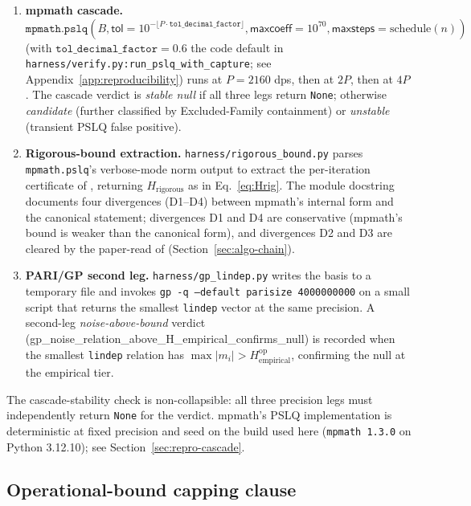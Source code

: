 \documentclass[11pt,a4paper]{article}
\newcommand{\Hrig}{H_{\mathrm{rigorous}}}
\newcommand{\Hempop}{H_{\mathrm{empirical}}^{\mathrm{op}}}
\begin{document}
\begin{enumerate}[itemsep=2pt,topsep=2pt]
\item \textbf{mpmath cascade.}
  $\texttt{mpmath.pslq}(B, \textsf{tol}=10^{-\lfloor P \cdot \texttt{tol\_decimal\_factor}\rfloor}, \textsf{maxcoeff}=10^{70},
  \textsf{maxsteps}=\text{schedule}(n))$
  (with $\texttt{tol\_decimal\_factor} = 0.6$ the code default in
  \texttt{harness/verify.py:run\_pslq\_with\_capture};
  see Appendix~\ref{app:reproducibility})
  runs at $P = 2160$ dps, then at $2P$, then at $4P$.
  The cascade verdict is \emph{stable null} if all three legs return
  \texttt{None}; otherwise \emph{candidate} (further classified by
  Excluded-Family containment) or \emph{unstable} (transient PSLQ false positive).

\item \textbf{Rigorous-bound extraction.}
  \texttt{harness/rigorous\_bound.py} parses \texttt{mpmath.pslq}'s
  verbose-mode norm output to extract the per-iteration certificate of
  \cite[Theorem~1]{fba1999}, returning
  $\Hrig$ as in Eq.~\eqref{eq:Hrig}.
  The module docstring documents four divergences (D1--D4) between mpmath's
  internal form and the canonical \cite[Theorem~1]{fba1999} statement;
  divergences D1 and D4 are conservative (mpmath's bound is weaker than the
  canonical form), and divergences D2 and D3 are cleared by
  the paper-read of \cite[\S 2]{bailey1998} (Section~\ref{sec:algo-chain}).

\item \textbf{PARI/GP second leg.}
  \texttt{harness/gp\_lindep.py} writes the basis to a temporary file and
  invokes \texttt{gp -q --default parisize 4000000000} on a small script
  that returns the smallest \texttt{lindep} vector at the same precision.
  A second-leg \emph{noise-above-bound} verdict
  (\textsf{gp\_noise\_relation\_above\_H\_empirical\_confirms\_null})
  is recorded when the smallest \texttt{lindep} relation has
  $\max|m_{i}| > \Hempop$, confirming the null at the empirical tier.
\end{enumerate}

The cascade-stability check is non-collapsible: all three precision legs
must independently return \texttt{None} for the verdict.
mpmath's PSLQ implementation is deterministic at fixed precision and seed
on the build used here (\texttt{mpmath 1.3.0} on Python 3.12.10); see
Section~\ref{sec:repro-cascade}.

\subsection{Operational-bound capping clause}\label{sec:capping}
\end{document}
